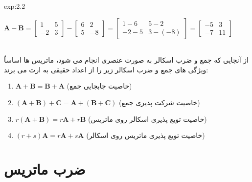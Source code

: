 {\begin{spacing}{1.5}
\begin{example}{exp:2.2}
\begin{enumerate}[label=\textbf{\arabic*}.]
{                    \item {
                        $\textbf{A}-\textbf{B}=\begin{bmatrix}
                                                   1  & 5 \\
                                                   -2 & 3
                        \end{bmatrix}-\begin{bmatrix}
                                          6 & 2  \\
                                          5 & -8
                        \end{bmatrix}=\begin{bmatrix}
                                          1-6  & 5-2    \\
                                          -2-5 & 3-(-8)
                        \end{bmatrix}=\begin{bmatrix}
                                          -5 & 3  \\
                                          -7 & 11
                        \end{bmatrix}$
                    }
                }
            \end{enumerate} \\

            از آنجایی که جمع و ضرب اسکالر به صورت عنصری انجام می شود، ماتریس ها اساساً ویژگی های جمع و ضرب اسکالر زیر را از اعداد حقیقی به ارث می برند:

            \begin{enumerate}[label=\textbf{\arabic*}.]
                \item {$\textbf{A}+\textbf{B}=\textbf{B}+\textbf{A}$ (خاصیت جابجایی جمع)}
                \item {$(\textbf{A}+\textbf{B})+\textbf{C}=\textbf{A}+(\textbf{B}+\textbf{C})$ (خاصیت شرکت پذیری جمع)}
                \item {$r(\textbf{A}+\textbf{B})=r\textbf{A}+r\textbf{B}$ (خاصیت تویع پذیری اسکالر روی ماتریس)}
                \item {$(r+s)\textbf{A}=r\textbf{A}+s\textbf{A}$ (خاصیت تویع پذیری ماتریس روی اسکالر)}
            \end{enumerate}
        \end{example}
    \end{spacing}
}


\section{\textbf{ضرب ماتریس}}
\label{sec:2.2}
